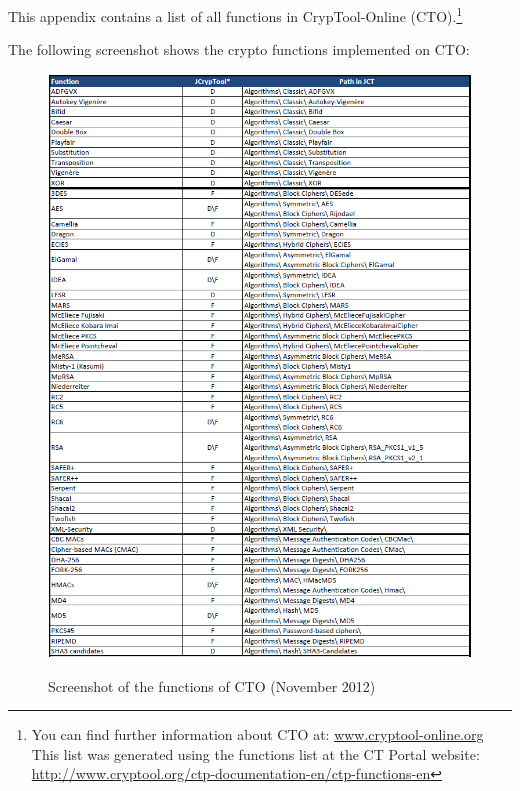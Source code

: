 \noindent This appendix contains a list of all
functions in CrypTool-Online (CTO).\footnote{%
  You can find further information about CTO at:
  \url{www.cryptool-online.org} \\
  This list was generated using the functions list at the CT Portal website:\\
  \url{http://www.cryptool.org/ctp-documentation-en/ctp-functions-en}}




\noindent The following screenshot shows the crypto functions implemented on CTO:
\clearpage
\begin{figure}[hb]
\begin{center}
\vspace{-30pt}
\includegraphics[scale=0.8, angle=0] {figures/JCT-functions-en-1}
\hypertarget{functions-overview-1-CTO}{}
\caption{Screenshot of the functions of CTO (November 2012)} 
\label{functions-overview-1-JCT}
\end{center}
\end{figure}
\clearpage

